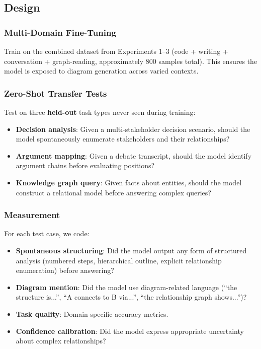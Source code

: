 \documentclass[11pt,a4paper]{article}
\begin{document}
\subsection{Design}

\subsubsection{Multi-Domain Fine-Tuning}

Train on the combined dataset from Experiments 1--3 (code + writing + conversation + graph-reading, approximately 800 samples total). This ensures the model is exposed to diagram generation across varied contexts.

\subsubsection{Zero-Shot Transfer Tests}

Test on three \textbf{held-out} task types never seen during training:
\begin{itemize}[nosep]
\item \textbf{Decision analysis}: Given a multi-stakeholder decision scenario, should the model spontaneously enumerate stakeholders and their relationships?
\item \textbf{Argument mapping}: Given a debate transcript, should the model identify argument chains before evaluating positions?
\item \textbf{Knowledge graph query}: Given facts about entities, should the model construct a relational model before answering complex queries?
\end{itemize}

\subsubsection{Measurement}

For each test case, we code:
\begin{itemize}[nosep]
\item \textbf{Spontaneous structuring}: Did the model output any form of structured analysis (numbered steps, hierarchical outline, explicit relationship enumeration) before answering?
\item \textbf{Diagram mention}: Did the model use diagram-related language (``the structure is...'', ``A connects to B via...'', ``the relationship graph shows...'')?
\item \textbf{Task quality}: Domain-specific accuracy metrics.
\item \textbf{Confidence calibration}: Did the model express appropriate uncertainty about complex relationships?
\end{itemize}
\end{document}

